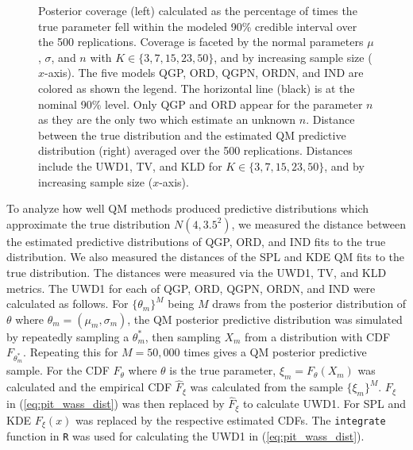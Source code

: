 \documentclass[preprint,12pt,authoryear]{elsarticle}
\begin{document}
\begin{figure}[hbt!]
\begin{subfigure}{.524\linewidth}
\end{subfigure}
\caption{Posterior coverage (left) calculated as the percentage of times the true parameter fell within the modeled 90\% credible interval over the 500 replications. Coverage is faceted by the normal parameters $\mu$, $\sigma$, and $n$ with $K \in \{3, 7, 15, 23, 50\}$, and by increasing sample size ($x$-axis). The five models QGP, ORD, QGPN, ORDN, and IND are colored as shown the legend. The horizontal line (black) is at the nominal 90\% level. Only QGP and ORD appear for the parameter $n$ as they are the only two which estimate an unknown $n$.
Distance between the true distribution and the estimated QM predictive distribution (right) averaged over the 500 replications. Distances include the UWD1, TV, and KLD for $K \in \{3, 7, 15, 23, 50\}$, and by increasing sample size ($x$-axis).}
\label{fig:normal_cov_dists}
\end{figure}




To analyze how well QM methods produced predictive distributions which approximate the true distribution $N(4, 3.5^2)$, we measured the distance between the estimated predictive distributions of QGP, ORD, and IND fits to the true distribution. 
We also measured the distances of the SPL and KDE QM fits to the true distribution. The distances were measured via the UWD1, TV, and KLD metrics. 
The UWD1 for each of QGP, ORD, QGPN, ORDN, and IND were calculated as follows. For $\{\theta_m\}^M$ being $M$ draws from the posterior distribution of $\theta$ where $\theta_m = (\mu_m, \sigma_m)$, the QM posterior predictive distribution was simulated by repeatedly sampling a $\theta_m^*$, then sampling $X_m$ from a distribution with CDF $F_{\theta_m^*}$. Repeating this for $M = 50,000$ times gives a QM posterior predictive sample. For the CDF $F_{\theta}$ where $\theta$ is the true parameter, $\xi_m = F_{\theta}(X_m)$ was calculated and the empirical CDF $\hat{F}_{\xi}$ was calculated from the sample $\{\xi_m\}^M$. $F_{\xi}$ in (\ref{eq:pit_wass_dist}) was then replaced by $\hat{F}_{\xi}$ to calculate UWD1. For SPL and KDE $F_{\xi}(x)$ was replaced by the respective estimated CDFs. The \texttt{integrate} function in \texttt{R} was used for calculating the UWD1 in (\ref{eq:pit_wass_dist}).
\end{document}
